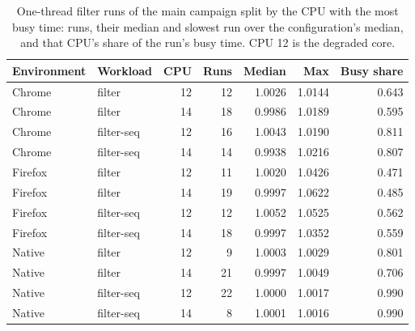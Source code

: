 \begin{table}[htbp]
\caption{One-thread filter runs of the main campaign split by the CPU with the most busy time: runs, their median and slowest run over the configuration's median, and that CPU's share of the run's busy time. CPU 12 is the degraded core.}\label{tab:core-split}
\centering\small
\begin{tabular}{llrrrrr}
\toprule
Environment & Workload & CPU & Runs & Median & Max & Busy share \\
\midrule
Chrome & filter & 12 & 12 & 1.0026 & 1.0144 & 0.643 \\
Chrome & filter & 14 & 18 & 0.9986 & 1.0189 & 0.595 \\
Chrome & filter-seq & 12 & 16 & 1.0043 & 1.0190 & 0.811 \\
Chrome & filter-seq & 14 & 14 & 0.9938 & 1.0216 & 0.807 \\
Firefox & filter & 12 & 11 & 1.0020 & 1.0426 & 0.471 \\
Firefox & filter & 14 & 19 & 0.9997 & 1.0622 & 0.485 \\
Firefox & filter-seq & 12 & 12 & 1.0052 & 1.0525 & 0.562 \\
Firefox & filter-seq & 14 & 18 & 0.9997 & 1.0352 & 0.559 \\
Native & filter & 12 & 9 & 1.0003 & 1.0029 & 0.801 \\
Native & filter & 14 & 21 & 0.9997 & 1.0049 & 0.706 \\
Native & filter-seq & 12 & 22 & 1.0000 & 1.0017 & 0.990 \\
Native & filter-seq & 14 & 8 & 1.0001 & 1.0016 & 0.990 \\
\bottomrule
\end{tabular}
\end{table}
